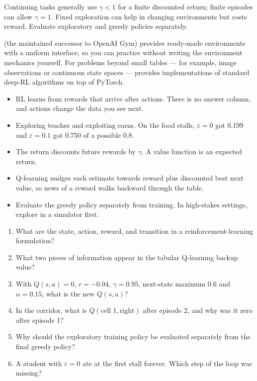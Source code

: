 \begin{pitfall}
Continuing tasks generally use $\gamma<1$ for a finite discounted return; finite episodes can allow $\gamma=1$. Fixed exploration can help in changing environments but costs reward. Evaluate exploratory and greedy policies separately.
\end{pitfall}

\begin{libnote}
 (the maintained successor to OpenAI Gym) provides ready-made environments with a uniform interface, so you can practice without writing the environment mechanics yourself. For problems beyond small tables --- for example, image observations or continuous state spaces ---  provides implementations of standard deep-RL algorithms on top of PyTorch.
\end{libnote}

\begin{chapterrecap}
\begin{itemize}
  \item RL learns from rewards that arrive after actions. There is no answer column, and actions change the data you see next.
  \item Exploring teaches and exploiting earns. On the food stalls, $\varepsilon=0$ got 0.199 and $\varepsilon=0.1$ got 0.750 of a possible 0.8.
  \item The return discounts future rewards by $\gamma$. A value function is an expected return.
  \item Q-learning nudges each estimate towards reward plus discounted best next value, so news of a reward walks backward through the table.
  \item Evaluate the greedy policy separately from training. In high-stakes settings, explore in a simulator first.
\end{itemize}
\end{chapterrecap}

\begin{quickcheck}
\begin{enumerate}
  \item What are the state, action, reward, and transition in a reinforcement-learning formulation?
  \item What two pieces of information appear in the tabular Q-learning backup value?
  \item With $Q(s,a)=0$, $r=-0.04$, $\gamma=0.95$, next-state maximum 0.6 and $\alpha=0.15$, what is the new $Q(s,a)$?
  \item In the corridor, what is $Q(\text{cell 1},\text{right})$ after episode 2, and why was it zero after episode 1?
  \item Why should the exploratory training policy be evaluated separately from the final greedy policy?
  \item A student with $\varepsilon=0$ ate at the first stall forever. Which step of the loop was missing?
\end{enumerate}
\end{quickcheck}
